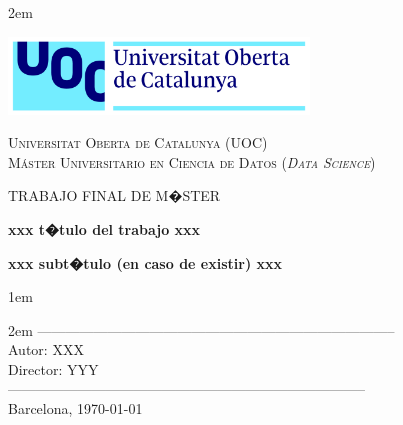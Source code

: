 \newpage
\thispagestyle{empty}

\baselineskip 2em


\centerline {\includegraphics[width=0.6\textwidth]{figs/UOC-logo}}
\begin{center}
\textsc{Universitat Oberta de Catalunya (UOC) \\
 Máster Universitario en Ciencia de Datos (\textit{Data Science})\\}


\vspace*{1.5cm}

\textsc{\Large TRABAJO FINAL DE M�STER}



\vspace*{1.5cm}

\textbf{\Large xxx t�tulo del trabajo xxx}

\textbf{\large xxx subt�tulo (en caso de existir) xxx}

\vspace{2.5cm}
\baselineskip 1em

\vspace{1cm}
\baselineskip 2em
-----------------------------------------------------------------------------\\
Autor:      XXX\\
Director:   YYY\\
-----------------------------------------------------------------------------\\
\vspace*{1.5cm}
Barcelona, \today

\end{center}

\newpage
\pagestyle{empty}
\hfill
